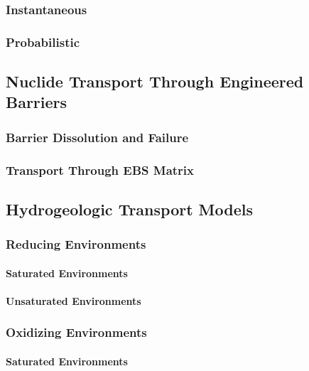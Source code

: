\subsubsection{Instantaneous}

\subsubsection{Probabilistic}


\subsection{Nuclide Transport Through Engineered Barriers}

\subsubsection{Barrier Dissolution and Failure}

\subsubsection{Transport Through EBS Matrix}



\subsection{Hydrogeologic Transport Models}

\subsubsection{Reducing Environments}

\paragraph{Saturated Environments}

\paragraph{Unsaturated Environments}

\subsubsection{Oxidizing Environments}

\paragraph{Saturated Environments}

